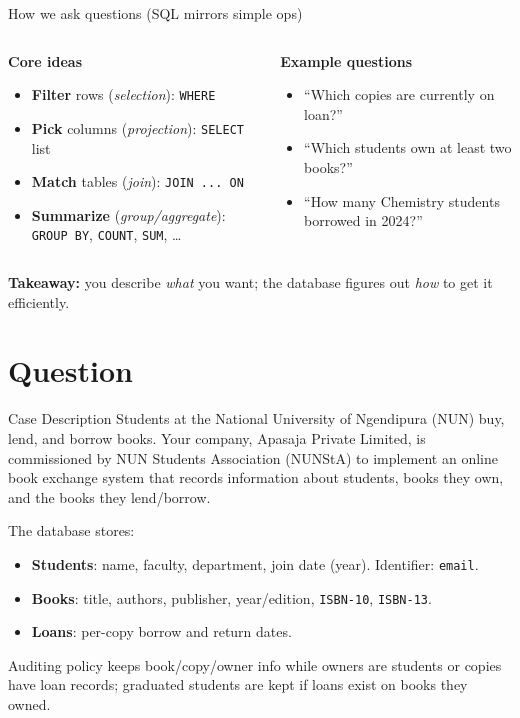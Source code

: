 \documentclass{beamer}
\begin{document}
\begin{frame}{How we ask questions (SQL mirrors simple ops)}
\begin{columns}[T,onlytextwidth]
\begin{column}{0.55\linewidth}
\textbf{Core ideas}
\begin{itemize}
  \item \textbf{Filter} rows (\emph{selection}): \texttt{WHERE}
  \item \textbf{Pick} columns (\emph{projection}): \texttt{SELECT} list
  \item \textbf{Match} tables (\emph{join}): \texttt{JOIN ... ON}
  \item \textbf{Summarize} (\emph{group/aggregate}): \texttt{GROUP BY}, \texttt{COUNT}, \texttt{SUM}, \dots
\end{itemize}
\end{column}
\begin{column}{0.45\linewidth}
\textbf{Example questions}
\begin{itemize}
  \item “Which copies are currently on loan?”
  \item “Which students own at least two books?”
  \item “How many Chemistry students borrowed in 2024?”
\end{itemize}
\end{column}
\end{columns}
\vspace{0.6em}
\textbf{Takeaway:} you describe \emph{what} you want; the database figures out \emph{how} to get it efficiently.
\end{frame}

\section{Question}

\begin{frame}{Case Description}
Students at the National University of Ngendipura (NUN) buy, lend, and borrow books.
Your company, Apasaja Private Limited, is commissioned by NUN Students Association (NUNStA) to implement an online book exchange system that records information about students, books they own, and the books they lend/borrow.

The database stores:
\begin{itemize}
  \item \textbf{Students}: name, faculty, department, join date (year). Identifier: \texttt{email}.
  \item \textbf{Books}: title, authors, publisher, year/edition, \texttt{ISBN-10}, \texttt{ISBN-13}.
  \item \textbf{Loans}: per-copy borrow and return dates.
\end{itemize}
Auditing policy keeps book/copy/owner info while owners are students or copies have loan records;
graduated students are kept if loans exist on books they owned.
\end{frame}
\end{document}
